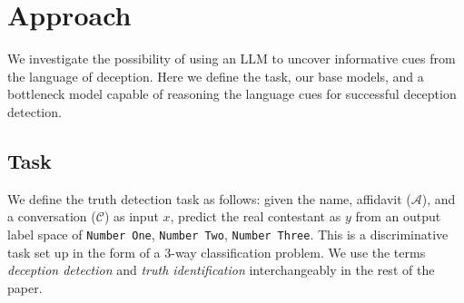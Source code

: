 \section{Approach}
We investigate the possibility of using an LLM to uncover informative cues from the language of deception. Here we define the task, our base models, and a bottleneck model capable of reasoning the language cues for successful deception detection.

\subsection{Task}
We define the truth detection task as follows: given the name, affidavit ($\mathcal{A}$), and a conversation ($\mathcal{C}$) as input $x$, predict the real contestant as $y$ from an output label space of {\texttt{Number One}, \texttt{Number Two}, \texttt{Number Three}}. This is a discriminative task set up in the form of a 3-way classification problem. We use the terms \emph{deception detection} and \emph{truth identification} interchangeably in the rest of the paper.

